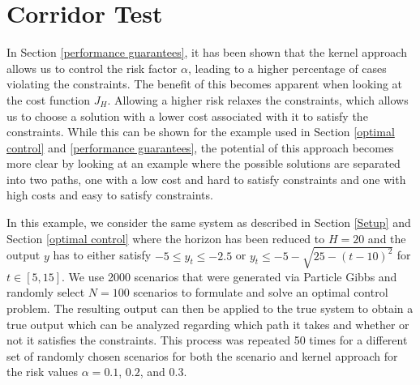 \section{Corridor Test} \label{corridor}

In Section \ref{performance guarantees}, it has been shown that the kernel approach allows us to control the risk factor $\alpha$, leading to a higher percentage of cases violating the constraints. The benefit of this becomes apparent when looking at the cost function $J_H$. Allowing a higher risk relaxes the constraints, which allows us to choose a solution with a lower cost associated with it to satisfy the constraints. While this can be shown for the example used in Section \ref{optimal control} and \ref{performance guarantees}, the potential of this approach becomes more clear by looking at an example where the possible solutions are separated into two paths, one with a low cost and hard to satisfy constraints and one with high costs and easy to satisfy constraints.

In this example, we consider the same system as described in Section \ref{Setup} and Section \ref{optimal control} where the horizon has been reduced to $H = 20$ and the output $y$ has to either satisfy $-5 \leq y_t \leq -2.5$ or $y_t \leq -5 - \sqrt{25- (t - 10)^2}$ for $t \in [5, 15]$. We use 2000 scenarios that were generated via Particle Gibbs and randomly select $N = 100$ scenarios to formulate and solve an optimal control problem. The resulting output can then be applied to the true system to obtain a true output which can be analyzed regarding which path it takes and whether or not it satisfies the constraints. This process was repeated 50 times for a different set of randomly chosen scenarios for both the scenario and kernel approach for the risk values $\alpha = 0.1$, $0.2$, and $0.3$.


